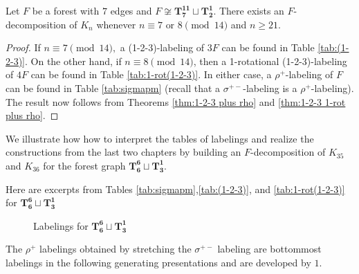 \begin{thm}\label{thm:7 or 8 mod 14}
    Let $F$ be a forest with $7$ edges and $F \not \cong \mathbf{T_{7}^{11}}\sqcup\mathbf{T_{2}^{1}}$. There exists an $F$-decomposition of $K_n$ whenever $n \equiv 7 \textrm{ or } 8 \pmod{14}$ and $n \geq 21.$
\end{thm}
\begin{proof}
    If $n \equiv 7 \pmod{14},$ a (1-2-3)-labeling of $3F$ can be found in Table \ref{tab:(1-2-3)}. On the other hand, if $n \equiv 8 \pmod{14}$, then a 1-rotational (1-2-3)-labeling of $4F$ can be found in Table \ref{tab:1-rot(1-2-3)}. In either case, a $\rho^{+}$-labeling of $F$ can be found in Table \ref{tab:sigmapm} (recall that a $\sigma^{+-}$-labeling is a $\rho^{+}$-labeling). The result now follows from Theorems \ref{thm:1-2-3 plus rho} and \ref{thm:1-2-3 1-rot plus rho}.
\end{proof}
We illustrate how how to interpret the tables of labelings and realize the constructions from the last two chapters by building an $F$-decomposition of $K_{35}$ and $K_{36}$ for the forest graph $\mathbf{T_{6}^{6}} \sqcup \mathbf{T_{3}^{1}}$.\newline
\begin{example}
\noindent Here are excerpts from Tables \ref{tab:sigmapm},\ref{tab:(1-2-3)}, and \ref{tab:1-rot(1-2-3)} for $\mathbf{T_{6}^{6}} \sqcup \mathbf{T_{3}^{1}}$

\begin{figure}[H]
\centering
        \scalebox{0.6}{}
        \caption{Labelings for $\mathbf{T_{6}^{6}} \sqcup \mathbf{T_{3}^{1}}$}
        \label{fig:example chart}
\end{figure}
\newpage
The $\rho^{+}$ labelings obtained by stretching the $\sigma^{+-}$ labeling are bottommost labelings in the following generating presentations and are developed by $1$.
\end{example}

        
        
